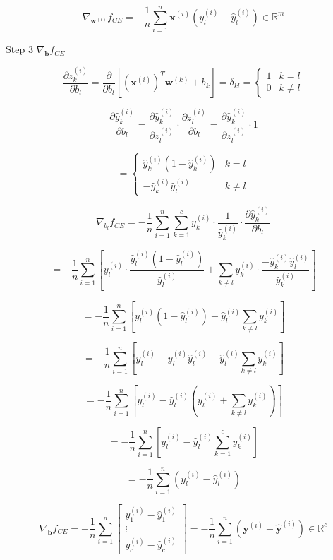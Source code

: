 \documentclass[
  letterpaper,
  DIV=11,
  numbers=noendperiod]{scrartcl}
\begin{document}
\[{\nabla_{\mathbf{w}^{(l)}} f_{CE} = -\frac{1}{n}\sum_{i=1}^n \mathbf{x}^{(i)} (y_l^{(i)} - \hat{y}_l^{(i)}) \in \mathbb{R}^m}\]

Step 3 \(\nabla_{\mathbf{b}} f_{CE}\)

\[\frac{\partial z_k^{(i)}}{\partial b_l} = \frac{\partial}{\partial b_l}[(\mathbf{x}^{(i)})^T \mathbf{w}^{(k)} + b_k] = \delta_{kl} = \begin{cases} 1 & k = l \\ 0 & k \neq l \end{cases}\]

\[\frac{\partial \hat{y}_k^{(i)}}{\partial b_l} = \frac{\partial \hat{y}_k^{(i)}}{\partial z_l^{(i)}} \cdot \frac{\partial z_l^{(i)}}{\partial b_l} = \frac{\partial \hat{y}_k^{(i)}}{\partial z_l^{(i)}} \cdot 1\]

\[= \begin{cases} \hat{y}_k^{(i)}(1 - \hat{y}_k^{(i)}) & k = l \\ -\hat{y}_k^{(i)} \hat{y}_l^{(i)} & k \neq l \end{cases}\]

\[\nabla_{b_l} f_{CE} = -\frac{1}{n}\sum_{i=1}^n\sum_{k=1}^c y_k^{(i)} \cdot \frac{1}{\hat{y}_k^{(i)}} \cdot \frac{\partial \hat{y}_k^{(i)}}{\partial b_l}\]

\[= -\frac{1}{n}\sum_{i=1}^n\left[y_l^{(i)} \cdot \frac{\hat{y}_l^{(i)}(1 - \hat{y}_l^{(i)})}{\hat{y}_l^{(i)}} + \sum_{k \neq l} y_k^{(i)} \cdot \frac{-\hat{y}_k^{(i)}\hat{y}_l^{(i)}}{\hat{y}_k^{(i)}}\right]\]

\[= -\frac{1}{n}\sum_{i=1}^n\left[y_l^{(i)}(1 - \hat{y}_l^{(i)}) - \hat{y}_l^{(i)} \sum_{k \neq l} y_k^{(i)}\right]\]

\[= -\frac{1}{n}\sum_{i=1}^n\left[y_l^{(i)} - y_l^{(i)}\hat{y}_l^{(i)} - \hat{y}_l^{(i)} \sum_{k \neq l} y_k^{(i)}\right]\]

\[= -\frac{1}{n}\sum_{i=1}^n\left[y_l^{(i)} - \hat{y}_l^{(i)}\left(y_l^{(i)} + \sum_{k \neq l} y_k^{(i)}\right)\right]\]

\[= -\frac{1}{n}\sum_{i=1}^n\left[y_l^{(i)} - \hat{y}_l^{(i)} \sum_{k=1}^c y_k^{(i)}\right]\]

\[= -\frac{1}{n}\sum_{i=1}^n (y_l^{(i)} - \hat{y}_l^{(i)})\]

\[\nabla_{\mathbf{b}} f_{CE} = -\frac{1}{n}\sum_{i=1}^n \begin{bmatrix} y_1^{(i)} - \hat{y}_1^{(i)} \\ \vdots \\ y_c^{(i)} - \hat{y}_c^{(i)} \end{bmatrix} = -\frac{1}{n}\sum_{i=1}^n (\mathbf{y}^{(i)} - \hat{\mathbf{y}}^{(i)}) \in \mathbb{R}^c\]
\end{document}
